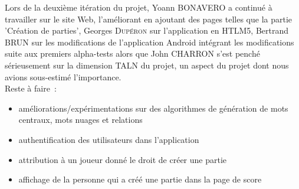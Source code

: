 \documentclass[a4paper,11pt,french]{article}
\def\android{Android\texttrademark}
\begin{document}
\noindent Lors de la deuxième itération du projet, Yoann \textsc{BONAVERO} a continué à travailler sur le site Web, l'améliorant en ajoutant des pages telles que la partie 'Création de parties', Georges \textsc{Dupéron} sur l'application en HTLM5, Bertrand \textsc{BRUN} sur les modifications de l'application \android{} intégrant les modifications suite aux premiers alpha-tests alors que John \textsc{CHARRON} s'est penché sérieusement sur la dimension TALN du projet, un aspect du projet dont nous avions sous-estimé l'importance. 
\\

\noindent Reste à faire~:
\begin{itemize}
  \item améliorations/expérimentations sur des algorithmes de génération de mots centraux, mots nuages et relations
  \item authentification des utilisateurs dans l'application
  \item attribution à un joueur donné le droit de créer une partie
  \item affichage de la personne qui a créé une partie dans la page de score 
\end{itemize}
\end{document}
